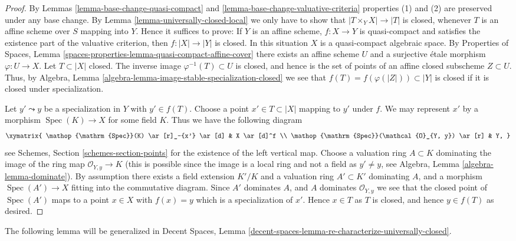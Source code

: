 \documentclass{stacks-project}
\theoremstyle{plain}
\theoremstyle{definition}
\theoremstyle{remark}
\numberwithin{equation}{subsection}
\def\Spec{\mathop{\mathrm{Spec}}}
\begin{document}
\begin{proof}
By Lemmas \ref{lemma-base-change-quasi-compact}
and \ref{lemma-base-change-valuative-criteria}
properties (1) and (2) are preserved under
any base change. By Lemma \ref{lemma-universally-closed-local}
we only have to show that $|T \times_Y X| \to |T|$ is closed,
whenever $T$ is an affine scheme over $S$ mapping into $Y$. Hence it
suffices to prove: If $Y$ is an affine scheme, $f : X \to Y$ is quasi-compact
and satisfies the existence part of the valuative criterion, then
$f : |X| \to |Y|$ is closed. In this situation $X$ is a quasi-compact
algebraic space. By
Properties of Spaces,
Lemma \ref{spaces-properties-lemma-quasi-compact-affine-cover}
there exists an affine scheme $U$ and a surjective \'etale morphism
$\varphi : U \to X$. Let $T \subset |X|$ closed. The inverse image
$\varphi^{-1}(T) \subset U$ is closed, and hence is the set of points
of an affine closed subscheme $Z \subset U$. Thus, by
Algebra, Lemma \ref{algebra-lemma-image-stable-specialization-closed}
we see that $f(T) = f(\varphi(|Z|)) \subset |Y|$ is closed if it is
closed under specialization.

\medskip\noindent
Let $y' \leadsto y$ be a specialization in $Y$ with $y' \in f(T)$.
Choose a point $x' \in T \subset |X|$ mapping to $y'$ under $f$.
We may represent $x'$ by a morphism $\Spec(K) \to X$
for some field $K$. Thus we have the following diagram
$$
\xymatrix{
\Spec(K) \ar[r]_-{x'} \ar[d] & X \ar[d]^f \\
\Spec(\mathcal{O}_{Y, y}) \ar[r] & Y,
}
$$
see
Schemes, Section \ref{schemes-section-points}
for the existence of the left vertical map.
Choose a valuation ring $A \subset K$ dominating the image of
the ring map $\mathcal{O}_{Y, y} \to K$ (this is possible since
the image is a local ring and not a field as $y' \not = y$, see
Algebra, Lemma \ref{algebra-lemma-dominate}).
By assumption there exists a field extension $K'/K$ and a
valuation ring $A' \subset K'$ dominating $A$, and a morphism
$\Spec(A') \to X$ fitting into the commutative diagram.
Since $A'$ dominates $A$, and $A$ dominates $\mathcal{O}_{Y, y}$
we see that the closed point of $\Spec(A')$ maps to
a point $x \in X$ with $f(x) = y$ which is a specialization of $x'$.
Hence $x \in T$ as $T$ is closed, and hence $y \in f(T)$ as desired.
\end{proof}

\noindent
The following lemma will be generalized in Decent Spaces, Lemma
\ref{decent-spaces-lemma-re-characterize-universally-closed}.
\end{document}
